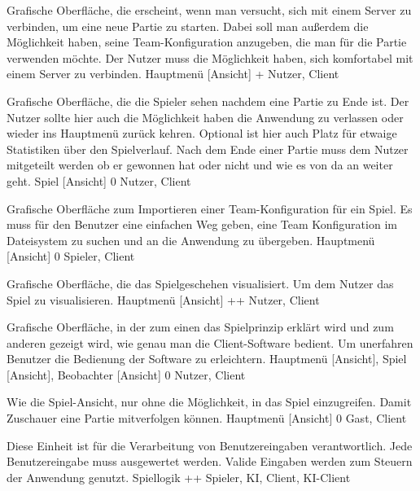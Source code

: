         {Grafische Oberfläche, die erscheint, wenn man versucht, sich mit einem Server zu verbinden, um eine neue Partie zu starten. Dabei soll man außerdem die Möglichkeit haben, seine Team-Konfiguration anzugeben, die man für die Partie verwenden möchte.}
        {Der Nutzer muss die Möglichkeit haben, sich komfortabel mit einem Server zu verbinden.}
        {Hauptmenü [Ansicht]}
        {+}
        {Nutzer, Client}

        {Grafische Oberfläche, die die Spieler sehen nachdem eine Partie zu Ende ist. Der Nutzer sollte hier auch die Möglichkeit haben die Anwendung zu verlassen oder wieder ins Hauptmenü zurück kehren. Optional ist hier auch Platz für etwaige Statistiken über den Spielverlauf.}
        {Nach dem Ende einer Partie muss dem Nutzer mitgeteilt werden ob er gewonnen hat oder nicht und wie es von da an weiter geht. }
        {Spiel [Ansicht]}
        {0}
        {Nutzer, Client}
        
        {Grafische Oberfläche zum Importieren einer Team-Konfiguration für ein Spiel.}
        {Es muss für den Benutzer eine einfachen Weg geben, eine Team Konfiguration im Dateisystem zu suchen und an die Anwendung zu übergeben.}
        {Hauptmenü [Ansicht]}
        {0}
        {Spieler, Client}
        
        {Grafische Oberfläche, die das Spielgeschehen visualisiert.}
        {Um dem Nutzer das Spiel zu visualisieren.}
        {Hauptmenü [Ansicht]}
        {++}
        {Nutzer, Client}	
        
        {Grafische Oberfläche, in der zum einen das Spielprinzip erklärt wird und zum anderen gezeigt wird, wie genau man die Client-Software bedient.}
        {Um unerfahren Benutzer die Bedienung der Software zu erleichtern.}
        {Hauptmenü [Ansicht], Spiel [Ansicht], Beobachter [Ansicht]}
        {0}
        {Nutzer, Client}
        
        {Wie die Spiel-Ansicht, nur ohne die Möglichkeit, in das Spiel einzugreifen.}
        {Damit Zuschauer eine Partie mitverfolgen können.}
        {Hauptmenü [Ansicht]}
        {0}
        {Gast, Client}

        {Diese Einheit ist für die Verarbeitung von Benutzereingaben verantwortlich.}
        {Jede Benutzereingabe muss ausgewertet werden. Valide Eingaben werden zum Steuern der Anwendung genutzt.}
        {Spiellogik}
        {++}
        {Spieler, KI, Client, KI-Client}
        
